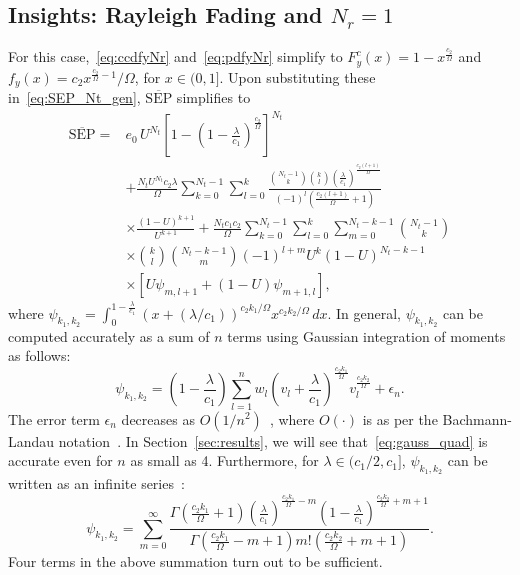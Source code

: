 \documentclass[journal]{IEEEtran}
\newcommand{\SEP}{\text{SEP}}
\newcommand{\nck}[2]{\binom{#1}{#2}}
\newcommand{\lam}{\lambda}
\newcommand{\error}{\epsilon_n}
\newcommand{\Nt}{{N_t}}
\newcommand{\Nr}{{N_r}}
\newcommand{\cone}{c_{1}}
\newcommand{\ctwo}{c_{2}}
\newcommand{\lambycone}{\frac{\lam}{\cone}}
\newcommand{\vl}{v_{\lidx}}
\newcommand{\lambyconeinl}{\lam/\cone}
\newcommand{\al}{\ctwo}
\newcommand{\snr}{\Omega}
\newcommand{\albysnr}[1][]{\frac{\al#1}{\snr}}
\newcommand{\albysnrinl}[1][]{{\al#1}/{\snr}}
\newcommand{\un}{U}
\newcommand{\psifun}[2]{\psi_{{#1},{#2}}}
\newcommand{\onemlc}{\left(1-\lambycone\right)}
\newcommand{\zerosep}{e_0}
\newcommand{\avgSEP}{\overline{\SEP}}
\newcommand{\akone}{\albysnr[k_1]}
\newcommand{\gqwt}{w_{\lidx}}
\newcommand{\lidx}{l}
\newcommand{\midx}{m}
\begin{document}
\subsection{Insights: Rayleigh Fading and $\Nr=1$}
\label{sec:spec_case_Nr_1} 
For this case,~\eqref{eq:ccdfyNr} and~\eqref{eq:pdfyNr} simplify to $F_{y}^{c}(x) = 1-x^{\albysnr}$ and $f_{y}(x) = \al x^{\albysnr-1}/\snr$, for $x \in (0,1]$. Upon substituting these in~\eqref{eq:SEP_Nt_gen}, $\avgSEP$ simplifies to 
%
\begin{align}
\label{eq:avgSEPoneNr} 
\avgSEP =&\zerosep\,\un^{\Nt}\left[1-\left(1-\lambycone\right)^{\albysnr[]}\right]^{\Nt} \nonumber\\
&+ \frac{\Nt\un^{\Nt}\al\lam}{\snr} \sum_{k=0}^{\Nt-1}\sum_{\lidx=0}^{k} \frac{\nck{\Nt-1}{k} \nck{k}{\lidx}\left( \lambycone\right) ^{\albysnr[(\lidx+1)]} }{(-1)^{\lidx} \left( \albysnr[(\lidx+1)]+1\right) }\nonumber\\ 
&\times\frac{\left(1-\un\right)^{k+1}}{\un^{k+1}}  + \frac{\Nt\cone\al}{\snr} \sum_{k=0}^{\Nt-1} \sum_{\lidx=0}^{k} \sum_{\midx=0}^{\Nt-k-1}  \!\!\!\binom{\Nt-1}{k}\nonumber \\ 
&\times\binom{k}{\lidx} \binom{\Nt-k-1}{\midx}(-1)^{\lidx+\midx} \un^{k} (1-\un)^{\Nt-k-1} \nonumber \\
&\times\left[ \un\psifun{\midx}{\lidx+1} +  \left(1-\un\right) \psifun{\midx+1}{\lidx} \right]
,
\end{align}
where $\psifun{k_1}{k_2} = \int_{0}^{1-\lambycone} \left(x+\left( \lambyconeinl\right) \right)^{\albysnrinl[k_1]} x^{\albysnrinl[k_2]} \,dx$. In general, $\psifun{k_1}{k_2}$ can be computed accurately as a sum of $n$  terms using Gaussian integration of moments as follows: 
\begin{equation}
\psifun{k_1}{k_2}  = {\onemlc} \sum_{\lidx=1}^{n} \gqwt {\left(\vl +\lambycone\right)}^{\albysnr[k_1]} \vl^{\albysnr[k_2]} + \error.
\label{eq:gauss_quad}
\end{equation}
The error term $\error$ decreases as $O(1/n^2)$~\cite{Xiang_2012_SIAM}, where $O(\cdot)$ is as per the Bachmann-Landau notation~\cite[Chap. 3]{CLRS_algo_book}. In Section~\ref{sec:results}, we will see that~\eqref{eq:gauss_quad}  is accurate even for $n$ as small as 4. Furthermore, for $\lam\in({\cone}/{2}, \cone]$, $\psifun{k_1}{k_2}$ can be written as an infinite series~\cite{gradshteyn00_book}:
%
\begin{equation}
\psifun{k_1}{k_2} = \sum_{\midx=0}^{\infty} \frac{\Gamma\left(\akone+1 \right) \left( \lambycone\right) ^{\albysnr[k_1]  - \midx} \left(1-\lambycone\right)^{\albysnr[k_2]+\midx+1}}{\Gamma\left(\akone-\midx+1 \right)\midx! \left(\albysnr[k_2]+\midx+1\right)}. 
\label{eq:inf_sum}
\end{equation}
Four terms in the above summation turn out to be sufficient. 
 
\end{document}
